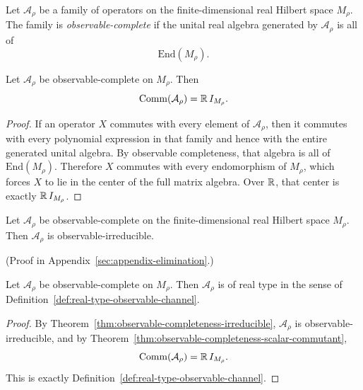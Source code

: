 \begin{definition}
\label{def:observable-completeness}
Let $\mathcal A_{\rho}$ be a family of operators on the finite-dimensional
real Hilbert space $M_{\rho}$. The family is \emph{observable-complete} if the
unital real algebra generated by $\mathcal A_{\rho}$ is all of
\[
\mathrm{End}(M_{\rho}).
\]
\end{definition}

\begin{theorem}
\label{thm:observable-completeness-scalar-commutant}
Let $\mathcal A_{\rho}$ be observable-complete on $M_{\rho}$. Then
\[
\mathrm{Comm}(\mathcal A_{\rho})=\mathbb{R}\,I_{M_{\rho}}.
\]
\end{theorem}

\begin{proof}
If an operator $X$ commutes with every element of $\mathcal A_{\rho}$, then it
commutes with every polynomial expression in that family and hence with the
entire generated unital algebra. By observable completeness, that algebra is
all of $\mathrm{End}(M_{\rho})$. Therefore $X$ commutes with every
endomorphism of $M_{\rho}$, which forces $X$ to lie in the center of the full
matrix algebra. Over $\mathbb{R}$, that center is exactly $\mathbb{R}\,I_{M_{\rho}}$.
\end{proof}

\begin{theorem}
\label{thm:observable-completeness-irreducible}
Let $\mathcal A_{\rho}$ be observable-complete on the finite-dimensional real
Hilbert space $M_{\rho}$. Then $\mathcal A_{\rho}$ is
observable-irreducible.
\end{theorem}

(Proof in Appendix~\ref{sec:appendix-elimination}.)

\begin{corollary}
\label{cor:observable-completeness-real-type}
Let $\mathcal A_{\rho}$ be observable-complete on $M_{\rho}$. Then
$\mathcal A_{\rho}$ is of real type in the sense of
Definition~\ref{def:real-type-observable-channel}.
\end{corollary}

\begin{proof}
By Theorem~\ref{thm:observable-completeness-irreducible},
$\mathcal A_{\rho}$ is observable-irreducible, and by
Theorem~\ref{thm:observable-completeness-scalar-commutant},
\[
\mathrm{Comm}(\mathcal A_{\rho})=\mathbb{R}\,I_{M_{\rho}}.
\]
This is exactly Definition~\ref{def:real-type-observable-channel}.
\end{proof}

